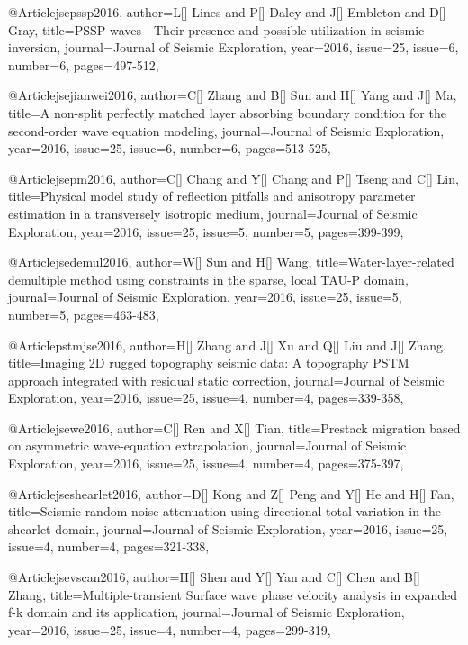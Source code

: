@Article{jsepssp2016,
  author={L[] Lines and P[] Daley and J[] Embleton and D[] Gray},
  title={PSSP waves - Their presence and possible utilization in seismic inversion},
  journal={Journal of Seismic Exploration},
  year=2016,
  issue=25,
  issue=6,
  number=6,
  pages={497-512},
}


@Article{jsejianwei2016,
  author={C[] Zhang and B[] Sun and H[] Yang and J[] Ma},
  title={A non-split perfectly matched layer absorbing boundary condition for the second-order wave equation modeling},
  journal={Journal of Seismic Exploration},
  year=2016,
  issue=25,
  issue=6,
  number=6,
  pages={513-525},
}

@Article{jsepm2016,
  author={C[] Chang and Y[] Chang and P[] Tseng and C[] Lin},
  title={Physical model study of reflection pitfalls and anisotropy parameter estimation in a transversely isotropic medium},
  journal={Journal of Seismic Exploration},
  year=2016,
  issue=25,
  issue=5,
  number=5,
  pages={399-399},
}

@Article{jsedemul2016,
  author={W[] Sun and H[] Wang},
  title={Water-layer-related demultiple method using constraints in the sparse, local TAU-P domain},
  journal={Journal of Seismic Exploration},
  year=2016,
  issue=25,
  issue=5,
  number=5,
  pages={463-483},
}

@Article{pstmjse2016,
  author={H[] Zhang and J[] Xu and Q[] Liu and J[] Zhang},
  title={Imaging 2D rugged topography seismic data: A topography PSTM approach integrated with residual static correction},
  journal={Journal of Seismic Exploration},
  year=2016,
  issue=25,
  issue=4,
  number=4,
  pages={339-358},
}

@Article{jsewe2016,
  author={C[] Ren and X[] Tian},
  title={Prestack migration based on asymmetric wave-equation extrapolation},
  journal={Journal of Seismic Exploration},
  year=2016,
  issue=25,
  issue=4,
  number=4,
  pages={375-397},
}

@Article{jseshearlet2016,
  author={D[] Kong and Z[] Peng and Y[] He and H[] Fan},
  title={Seismic random noise attenuation using directional total variation in the shearlet domain},
  journal={Journal of Seismic Exploration},
  year=2016,
  issue=25,
  issue=4,
  number=4,
  pages={321-338},
}

@Article{jsevscan2016,
  author={H[] Shen and Y[] Yan and C[] Chen and B[] Zhang},
  title={Multiple-transient Surface wave phase velocity analysis in expanded f-k domain and its application},
  journal={Journal of Seismic Exploration},
  year=2016,
  issue=25,
  issue=4,
  number=4,
  pages={299-319},
}

